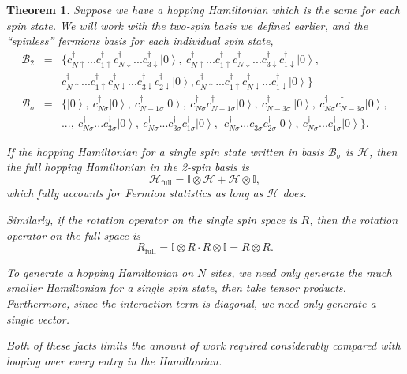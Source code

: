 \documentclass{article}
\newcommand{\ket}[1]{\left| #1 \right>} %
\newtheorem{theorem}{Theorem}[section]
\theoremstyle{definition}
\begin{document}
\begin{theorem}
Suppose we have a hopping Hamiltonian which is the same for each spin state. We will work with the two-spin basis we defined earlier, and the ``spinless'' fermions basis for each individual spin state,
\begin{eqnarray*}
\mathcal{B}_2 &=& \{ c^\dag_{N\uparrow}...c^\dag_{1\uparrow}c^\dag_{N\downarrow}...c^\dag_{3\downarrow} \ket{0},\ c^\dag_{N\uparrow}...c^\dag_{1\uparrow}c^\dag_{N\downarrow}...c^\dag_{3\downarrow} c^\dag_{1\downarrow} \ket{0}, \nonumber \\
&& c^\dag_{N\uparrow}...c^\dag_{1\uparrow}c^\dag_{N\downarrow}...c^\dag_{3\downarrow}c^\dag_{2\downarrow} \ket{0}, c^\dag_{N\uparrow}...c^\dag_{1\uparrow}c^\dag_{N\downarrow}...c^\dag_{1\downarrow} \ket{0} \} \nonumber\\
\mathcal{B}_\sigma &=& \{\ket{0}, \ c^\dag_{N\sigma} \ket{0}, \ c^\dag_{N-1\sigma} \ket{0}, \ c^\dag_{N\sigma} c^\dag_{N-1\sigma} \ket{0}, \ c^\dag_{N-3\sigma}\ \ket{0}, \ c^\dag_{N\sigma} c^\dag_{N-3\sigma} \ket{0} ,\\
&& ...,\ c^\dag_{N\sigma}...c^\dag_{3\sigma} \ket{0}, \ c^\dag_{N\sigma}...c^\dag_{3\sigma} c^\dag_{1\sigma} \ket{0},\ \ c^\dag_{N\sigma}...c^\dag_{3\sigma} c^\dag_{2\sigma} \ket{0}, \ c^\dag_{N\sigma}...c^\dag_{1\sigma} \ket{0}\} \nonumber.
\end{eqnarray*}

If the hopping Hamiltonian for a single spin state written in basis $\mathcal{B}_\sigma$ is $\mathcal{H}$, then the full hopping Hamiltonian in the 2-spin basis is
\begin{equation}
\mathcal{H}_\text{full} = \mathbb{I} \otimes \mathcal{H} + \mathcal{H} \otimes \mathbb{I},
\end{equation}
which fully accounts for Fermion statistics as long as $\mathcal{H}$ does.

Similarly, if the rotation operator on the single spin space is $R$, then the rotation operator on the full space is
\begin{equation}
R_\text{full} = \mathbb{I} \otimes R \cdot R \otimes \mathbb{I} = R \otimes R.
\end{equation}

To generate a hopping Hamiltonian on $N$ sites, we need only generate the much smaller Hamiltonian for a single spin state, then take tensor products. Furthermore, since the interaction term is diagonal, we need only generate a single vector. 

Both of these facts limits the amount of work required considerably compared with looping over every entry in the Hamiltonian.
\end{theorem}
\end{document}
